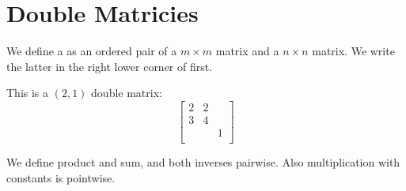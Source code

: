 
\section{Double Matricies}

\begin{definition}
  We define a  as an ordered pair of a $m \times m$ matrix and a $n \times n$ matrix. We write the latter in the right lower corner of first.
\end{definition}

\begin{example}
  This is a $(2, 1)$ double matrix:
  $$\begin{bmatrix}
    2 & 2 & \\ 
    3 & 4 & \\
    & & 1 \\
  \end{bmatrix}$$
\end{example}

\begin{definition}
  We define product and sum, and both inverses pairwise. Also multiplication with constants is pointwise.
\end{definition}


